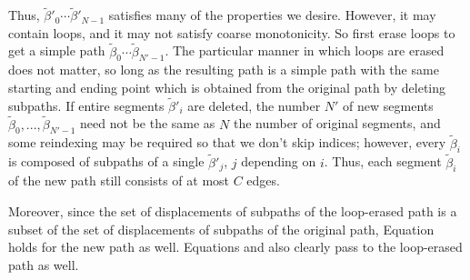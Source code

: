 \documentclass[12pt,reqno]{article}
\makeatletter
\let\reftagform@=\tagform@
\def\tagform@#1{\maketag@@@{(\ignorespaces\textcolor{purple}{#1}\unskip\@@italiccorr)}}
\renewcommand{\eqref}[1]{\textup{\reftagform@{\ref{#1}}}}
\numberwithin{equation}{section}
\makeatother
\begin{document}
Thus, $\tilde{\beta}'_0 \cdots \tilde{\beta}'_{N-1}$ satisfies many of the properties we desire. However, it may contain loops, and it may not 
satisfy coarse monotonicity.
So first erase loops to get a 
simple path $\tilde{\beta}_0 \cdots \tilde{\beta}_{N'-1}$. The particular manner in which loops are erased does not matter, so long as the resulting
path is a simple path with the same starting and ending point which is obtained from the original path by deleting subpaths. 
If entire segments $\tilde{\beta}'_i$ are deleted, the number $N'$ of new segments $\tilde{\beta}_0,...,\tilde{\beta}_{N'-1}$ need not be the 
same as $N$ the number of original segments, and some reindexing may be required so that we don't skip indices;
however, every $\tilde{\beta}_i$ is composed of subpaths of a single $\tilde{\beta}'_j$, $j$ depending on $i$.
Thus, each segment $\tilde{\beta}_i$ of the new path still consists of at most $C$ edges. 

Moreover, since the set of displacements of subpaths
of the loop-erased path is a subset of the set of displacements of subpaths of the original path, Equation \eqref{eq:stillnearparallel} 
holds for the new path as well. Equations \eqref{eq:hitstarget} and \eqref{eq:nottoolong} also clearly pass to the loop-erased path as well.
\end{document}
